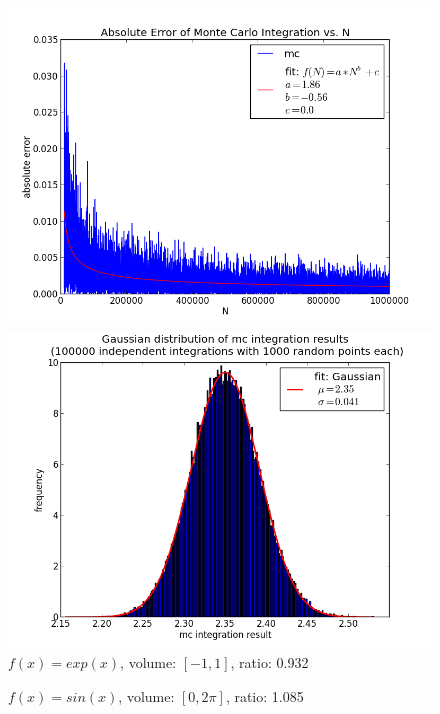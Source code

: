\documentclass[12pt,a4paper,titlepage]{article}
\begin{document}
\begin{appendix}
\begin{figure}
	\centering
	\caption{$f(x)=exp(x)$, volume: $[-1,1]$, ratio: 0.932}
	\begin{minipage}[b]{\linewidth}
		\centering
		\includegraphics[width=\linewidth]{Plots/eFunktion}
	\end{minipage}
	\begin{minipage}[b]{\linewidth}
		\centering
		\includegraphics[width=\linewidth]{Plots/eFunktionHist}
	\end{minipage}
	\label{fig:linear}
\end{figure}
\begin{figure}
	\centering
	\caption{$f(x)=sin(x)$, volume: $[0,2\pi]$, ratio: 1.085}
	\begin{minipage}[b]{\linewidth}

\end{minipage}
\end{figure}
\end{appendix}
\end{document}
